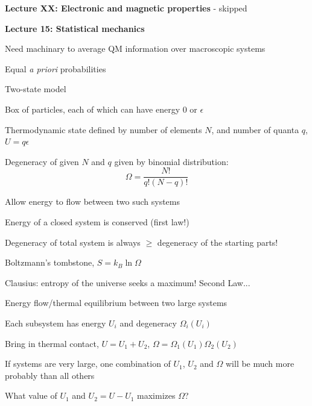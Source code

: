 \documentclass[11pt]{article}
\begin{document}
\begin{outline}
\item {\bf Lecture XX: Electronic and magnetic properties} - skipped

\item {\bf Lecture 15: Statistical mechanics}
  \begin{outline}
    \item Need machinary to average QM information over macroscopic systems
    \item Equal {\em a priori} probabilities
    \item Two-state model
      \begin{outline}
      \item Box of particles, each of which can have energy 0 or $\epsilon$
      \item Thermodynamic state defined by number of elements $N$, and number of
        quanta $q$, $U=q\epsilon$
      \item Degeneracy of given $N$ and $q$ given by binomial distribution:
        \begin{displaymath}
          \Omega=\frac{N!}{q!(N-q)!}
        \end{displaymath}
      \item Allow energy to flow between two such systems
        \begin{outline}
        \item Energy of a closed system is conserved (first law!)
        \item Degeneracy of total system is always $\geq$ degeneracy of the
          starting parts!
        \item Boltzmann's tombstone, $S = k_B \ln \Omega$
        \item Clausius: entropy of the universe seeks a maximum!  Second Law...
        \end{outline}
      \end{outline}
      \item Energy flow/thermal equilibrium between two large systems
        \begin{outline}
          \item Each subsystem has energy $U_i$ and degeneracy $\Omega_i(U_i)$
          \item Bring in thermal contact, $U=U_1+U_2$, $\Omega=\Omega_1(U_1)\Omega_2(U_2)$
          \item If systems are very large, one combination of $U_1$, $U_2$ and $\Omega$
            will be much more probably than all others
          \item What value of $U_1$ and $U_2=U-U_1$ maximizes $\Omega$?

\end{outline}
\end{outline}
\end{outline}
\end{document}
